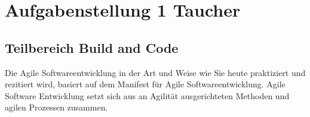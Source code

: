 \newpage
\section{Aufgabenstellung 1 Taucher}

                      


\subsection{Teilbereich Build and Code}
Die Agile Softwareentwicklung in der Art und Weise wie Sie heute praktiziert und rezitiert wird, basiert auf dem Manifest für Agile Softwareentwicklung. 
Agile Software Entwicklung setzt sich aus an Agilität ausgerichteten Methoden und agilen Prozessen zusammen. 

